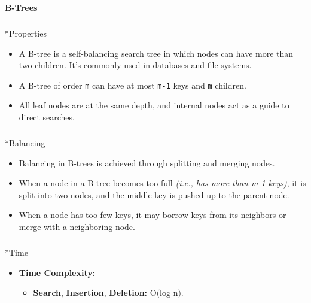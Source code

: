 \documentclass[
  letterpaper,
  DIV=11,
  numbers=noendperiod]{scrreprt}
\makeatletter
\let\oldsubparagraph\subparagraph
\renewcommand{\subparagraph}{
    \@ifstar
      \xxxSubParagraphStar
      \xxxSubParagraphNoStar
  }
\newcommand{\xxxSubParagraphStar}[1]{\oldsubparagraph*{#1}\mbox{}}
\newcommand{\xxxSubParagraphNoStar}[1]{\oldsubparagraph{#1}\mbox{}}
\providecommand{\tightlist}{%
  \setlength{\itemsep}{0pt}\setlength{\parskip}{0pt}}
\makeatother
\begin{document}
\begin{tcolorbox}[enhanced jigsaw, colframe=quarto-callout-note-color-frame, toprule=.15mm, bottomrule=.15mm, rightrule=.15mm, colback=white, breakable, arc=.35mm, opacityback=0, left=2mm, leftrule=.75mm]

\vspace{-3mm}\textbf{B-Trees}\vspace{3mm}

\subparagraph*{Properties}\label{properties-2}

\begin{itemize}
\tightlist
\item
  A B-tree is a self-balancing search tree in which nodes can have more
  than two children. It's commonly used in databases and file systems.
\item
  A B-tree of order \texttt{m} can have at most \texttt{m-1} keys and
  \texttt{m} children.
\item
  All leaf nodes are at the same depth, and internal nodes act as a
  guide to direct searches.
\end{itemize}

\subparagraph*{Balancing}\label{balancing-2}

\begin{itemize}
\tightlist
\item
  Balancing in B-trees is achieved through splitting and merging nodes.
\item
  When a node in a B-tree becomes too full \emph{(i.e., has more than
  m-1 keys)}, it is split into two nodes, and the middle key is pushed
  up to the parent node.
\item
  When a node has too few keys, it may borrow keys from its neighbors or
  merge with a neighboring node.
\end{itemize}

\subparagraph*{Time}\label{time-2}

\begin{itemize}
\item
  \textbf{Time Complexity:}

  \begin{itemize}
  \tightlist
  \item
    \textbf{Search}, \textbf{Insertion}, \textbf{Deletion:}
    \(\text{O(log n)}\).
  \end{itemize}
\end{itemize}


\end{tcolorbox}
\end{document}
